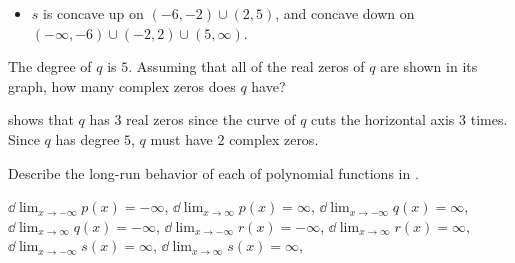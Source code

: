 \begin{exercises}
\begin{problem}
\begin{subproblem}
\begin{shortsolution}
\begin{itemize}
 			\item $s$ is concave up on $(-6,-2)\cup (2,5)$, and concave down on $(-\infty,-6)\cup (-2,2)\cup (5,\infty)$.
 		\end{itemize}
 	\end{shortsolution}
 \end{subproblem}
 \begin{subproblem}
 	The degree of $q$ is $5$. Assuming that all of the real zeros of $q$ are
 	shown in its graph, how many complex zeros does $q$ have?
 	\begin{shortsolution}
 		 shows that $q$ has $3$ real zeros 
 		since the curve of $q$ cuts the horizontal axis $3$ times. 
 		Since $q$ has degree $5$, $q$ must have $2$ complex zeros.
 	\end{shortsolution}
 \end{subproblem}
 \end{problem}
  	  
 \begin{problem}
 Describe the long-run behavior of each of polynomial functions in 
 .
 \begin{shortsolution}
 	$\dd\lim_{x\rightarrow-\infty}p(x)=-\infty$,
 	$\dd\lim_{x\rightarrow\infty}p(x)=\infty$,
 	$\dd\lim_{x\rightarrow-\infty}q(x)=\infty$,
 	$\dd\lim_{x\rightarrow\infty}q(x)=-\infty$,
 	$\dd\lim_{x\rightarrow-\infty}r(x)=-\infty$,
 	$\dd\lim_{x\rightarrow\infty}r(x)=\infty$,
 	$\dd\lim_{x\rightarrow-\infty}s(x)=\infty$,
 	$\dd\lim_{x\rightarrow\infty}s(x)=\infty$,
 \end{shortsolution}
 \end{problem}
  	  

\end{exercises}
